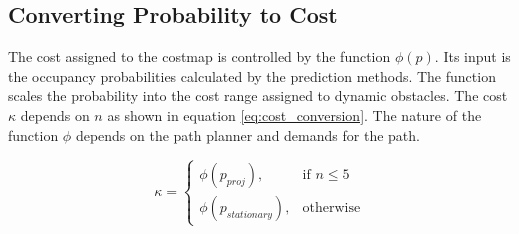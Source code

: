 \subsection{Converting Probability to Cost}
The cost assigned to the costmap is controlled by the function $\phi(p)$. Its input is the occupancy probabilities calculated by the prediction methods.
The function scales the probability into the cost range assigned to dynamic obstacles.
The cost $\kappa$ depends on $n$ as shown in equation \ref{eq:cost_conversion}.
The nature of the function $\phi$ depends on the path planner and demands for the path. 

\begin{equation}
\label{eq:cost_conversion}
\kappa = 
\begin{cases}
\phi(p_{proj}), & \text{if } n \le 5
\\
\phi(p_{stationary}), & \text{otherwise}
\end{cases}
\end{equation}